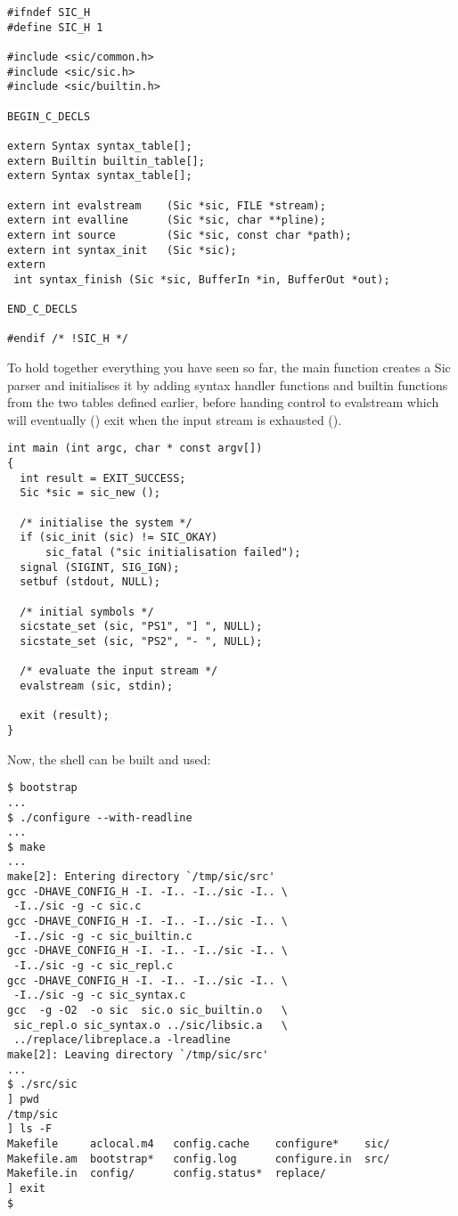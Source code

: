 \begin{Verbatim}[frame=single]
#ifndef SIC_H
#define SIC_H 1

#include <sic/common.h>
#include <sic/sic.h>
#include <sic/builtin.h>

BEGIN_C_DECLS

extern Syntax syntax_table[];
extern Builtin builtin_table[];
extern Syntax syntax_table[];

extern int evalstream    (Sic *sic, FILE *stream);
extern int evalline      (Sic *sic, char **pline);
extern int source        (Sic *sic, const char *path);
extern int syntax_init   (Sic *sic);
extern 
 int syntax_finish (Sic *sic, BufferIn *in, BufferOut *out);

END_C_DECLS

#endif /* !SIC_H */
\end{Verbatim}

To hold together everything you have seen so far, the main function creates 
a Sic parser and initialises it by adding syntax handler functions and builtin 
functions from the two tables defined earlier, before handing control to 
evalstream which will eventually ({\MbQ{}}) exit when the input stream is 
exhausted ({\MbQ{}}).

\begin{Verbatim}[frame=single]
int main (int argc, char * const argv[])
{
  int result = EXIT_SUCCESS;
  Sic *sic = sic_new ();
  
  /* initialise the system */
  if (sic_init (sic) != SIC_OKAY)
      sic_fatal ("sic initialisation failed");
  signal (SIGINT, SIG_IGN);
  setbuf (stdout, NULL);

  /* initial symbols */
  sicstate_set (sic, "PS1", "] ", NULL);
  sicstate_set (sic, "PS2", "- ", NULL);
  
  /* evaluate the input stream */
  evalstream (sic, stdin);

  exit (result);
}
\end{Verbatim}

Now, the shell can be built and used: 

\begin{Verbatim}[frame=single]
$ bootstrap
...
$ ./configure --with-readline
...
$ make
...
make[2]: Entering directory `/tmp/sic/src'
gcc -DHAVE_CONFIG_H -I. -I.. -I../sic -I.. \
 -I../sic -g -c sic.c
gcc -DHAVE_CONFIG_H -I. -I.. -I../sic -I.. \
 -I../sic -g -c sic_builtin.c
gcc -DHAVE_CONFIG_H -I. -I.. -I../sic -I.. \
 -I../sic -g -c sic_repl.c
gcc -DHAVE_CONFIG_H -I. -I.. -I../sic -I.. \
 -I../sic -g -c sic_syntax.c
gcc  -g -O2  -o sic  sic.o sic_builtin.o   \
 sic_repl.o sic_syntax.o ../sic/libsic.a   \
 ../replace/libreplace.a -lreadline
make[2]: Leaving directory `/tmp/sic/src'
...
$ ./src/sic
] pwd
/tmp/sic
] ls -F
Makefile     aclocal.m4   config.cache    configure*    sic/
Makefile.am  bootstrap*   config.log      configure.in  src/
Makefile.in  config/      config.status*  replace/
] exit
$
\end{Verbatim}

